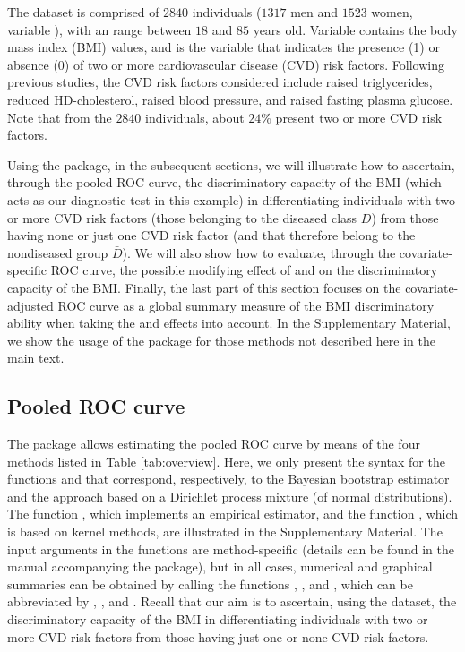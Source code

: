 The dataset is comprised of $2840$ individuals ($1317$ men and $1523$ women, variable ), with an  range between $18$ and $85$ years old. Variable  contains the body mass index (BMI) values, and  is the variable that indicates the presence (1) or absence (0) of two or more cardiovascular disease (CVD) risk factors. Following previous studies, the CVD risk factors considered include raised triglycerides, reduced HD-cholesterol, raised blood pressure, and raised fasting plasma glucose. Note that from the $2840$ individuals, about $24\%$ present two or more CVD risk factors.

Using the  package, in the subsequent sections, we will illustrate how to ascertain, through the pooled ROC curve, the discriminatory capacity of the BMI (which acts as our diagnostic test in this example) in differentiating individuals with two or more CVD risk factors (those belonging to the diseased class $D$) from those having none or just one CVD risk factor (and that therefore belong to the nondiseased group $\bar{D}$). We will also show how to evaluate, through the covariate-specific ROC curve, the possible modifying effect of  and  on the discriminatory capacity of the BMI. Finally, the last part of this section focuses on the covariate-adjusted ROC curve as a global summary measure of the BMI discriminatory ability when taking the  and  effects into account. In the Supplementary Material, we show the usage of the package for those methods not described here in the main text.

\subsection{Pooled ROC curve}\label{sec:pooledroc_ilu}
The  package allows estimating the pooled ROC curve by means of the four methods listed in Table \ref{tab:overview}. Here, we only present the syntax for the functions  and  that correspond, respectively, to the Bayesian bootstrap estimator and the approach based on a Dirichlet process mixture (of normal distributions). The function , which implements an empirical estimator, and the function , which is based on kernel methods, are illustrated in the Supplementary Material. The input arguments in the functions are method-specific (details can be found in the manual accompanying the package), but in all cases, numerical and graphical summaries can be obtained by calling the functions , , and , which can be abbreviated by , , and . Recall that our aim is to ascertain, using the  dataset, the discriminatory capacity of the BMI in differentiating individuals with two or more CVD risk factors from those having just one or none CVD risk factors.

